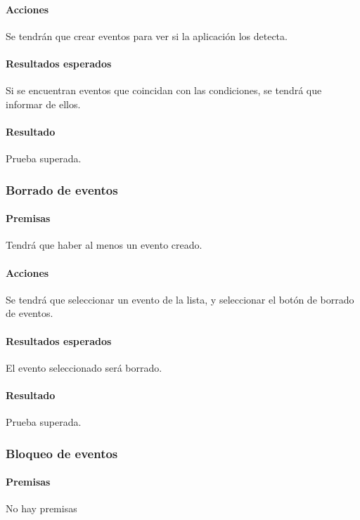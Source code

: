 \paragraph{Acciones}
Se tendrán que crear eventos para ver si la aplicación los detecta.

\paragraph{Resultados esperados}
Si se encuentran eventos que coincidan con las condiciones, se tendrá que informar de ellos.

\paragraph{Resultado}
Prueba superada.

\subsubsection{Borrado de eventos}

\paragraph{Premisas}
Tendrá que haber al menos un evento creado.

\paragraph{Acciones}
Se tendrá que seleccionar un evento de la lista, y seleccionar el botón de borrado de eventos.

\paragraph{Resultados esperados}
El evento seleccionado será borrado.

\paragraph{Resultado}
Prueba superada.

\subsubsection{Bloqueo de eventos}

\paragraph{Premisas}
No hay premisas

